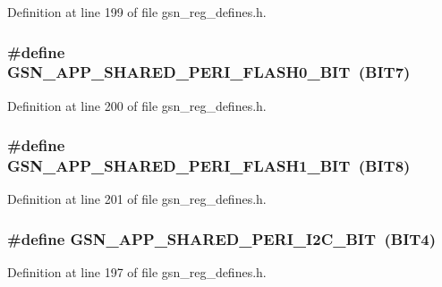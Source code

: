 Definition at line 199 of file gsn\_\-reg\_\-defines.h.

\hypertarget{a00546_a28328764d983da313bc0923f941bf50e}{
\subsubsection[{GSN\_\-APP\_\-SHARED\_\-PERI\_\-FLASH0\_\-BIT}]{\setlength{\rightskip}{0pt plus 5cm}\#define GSN\_\-APP\_\-SHARED\_\-PERI\_\-FLASH0\_\-BIT~(BIT7)}}
\label{a00546_a28328764d983da313bc0923f941bf50e}


Definition at line 200 of file gsn\_\-reg\_\-defines.h.

\hypertarget{a00546_a4f97113d1c2093583811a49e940ec4ce}{
\subsubsection[{GSN\_\-APP\_\-SHARED\_\-PERI\_\-FLASH1\_\-BIT}]{\setlength{\rightskip}{0pt plus 5cm}\#define GSN\_\-APP\_\-SHARED\_\-PERI\_\-FLASH1\_\-BIT~(BIT8)}}
\label{a00546_a4f97113d1c2093583811a49e940ec4ce}


Definition at line 201 of file gsn\_\-reg\_\-defines.h.

\hypertarget{a00546_a076051e6f0d19e45e8744f9bb5e2db96}{
\subsubsection[{GSN\_\-APP\_\-SHARED\_\-PERI\_\-I2C\_\-BIT}]{\setlength{\rightskip}{0pt plus 5cm}\#define GSN\_\-APP\_\-SHARED\_\-PERI\_\-I2C\_\-BIT~(BIT4)}}
\label{a00546_a076051e6f0d19e45e8744f9bb5e2db96}


Definition at line 197 of file gsn\_\-reg\_\-defines.h.

